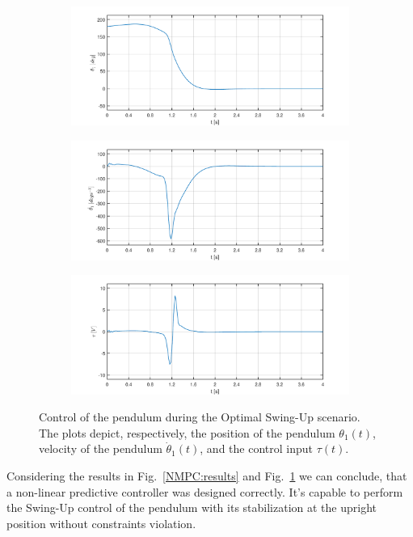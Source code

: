 \begin{figure}[H]
	\centering
	\begin{subfigure}
		\centering
		\includegraphics[scale=0.6]{images/Oswing/pend.pdf}  
	\end{subfigure}
	\begin{subfigure}
		\centering
		\includegraphics[scale=0.6]{images/Oswing/dpend.pdf}  
	\end{subfigure}
	\begin{subfigure}
		\centering
		\includegraphics[scale=0.6]{images/Oswing/control.pdf}  
	\end{subfigure}
	\caption{Control of the pendulum during the Optimal Swing-Up scenario. The plots depict, respectively, the position of the pendulum $\theta_1(t)$, velocity of the pendulum $\dot{\theta}_1(t)$, and the control input $\tau(t)$.}
	\label{NMPC:results1}
\end{figure}
Considering the results in Fig.~\ref{NMPC:results} and Fig.~\ref{NMPC:results1} we can conclude, that a non-linear predictive controller was designed correctly. It's capable to perform the Swing-Up control of the pendulum with its stabilization at the upright position without constraints violation. 
